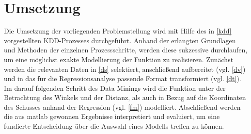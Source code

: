 \chapter{Umsetzung}
\label{umsetzung}

Die Umsetzung der vorliegenden Problemstellung wird mit Hilfe des in \vref{kdd} vorgestellten KDD-Prozesses durchgeführt. Anhand der erlangten Grundlagen und Methoden der einzelnen Prozessschritte, werden diese sukzessive durchlaufen, um eine möglichst exakte Modellierung der Funktion zu realisieren. Zunächst werden die relevanten Daten in \vref{ds} selektiert, anschließend aufbereitet (vgl. \vref{dv}) und in das für die Regressionsanalyse passende Format transformiert (vgl. \vref{dt}). Im darauf folgenden Schritt des Data Minings wird die Funktion unter der Betrachtung des Winkels und der Distanz, als auch in Bezug auf die Koordinaten des Schusses anhand der Regression (vgl. \vref{fm}) modelliert. Abschließend werden die aus \gls{matlab} gewonnen Ergebnisse interpretiert und evaluiert, um eine fundierte Entscheidung über die Auswahl eines Modells treffen zu können.





